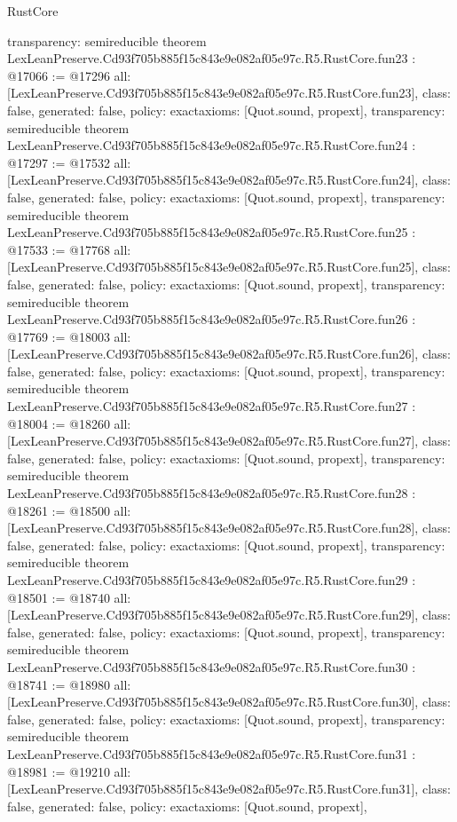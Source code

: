 \begin{lexlean}{RustCore}
\begin{coremodule}
{  transparency: semireducible
}
theorem LexLeanPreserve.Cd93f705b885f15c843e9e082af05e97c.R5.RustCore.fun23 : @17066 := @17296 {
  all: [LexLeanPreserve.Cd93f705b885f15c843e9e082af05e97c.R5.RustCore.fun23],
  class: false,
  generated: false,
  policy: exact{axioms: [Quot.sound, propext]},
  transparency: semireducible
}
theorem LexLeanPreserve.Cd93f705b885f15c843e9e082af05e97c.R5.RustCore.fun24 : @17297 := @17532 {
  all: [LexLeanPreserve.Cd93f705b885f15c843e9e082af05e97c.R5.RustCore.fun24],
  class: false,
  generated: false,
  policy: exact{axioms: [Quot.sound, propext]},
  transparency: semireducible
}
theorem LexLeanPreserve.Cd93f705b885f15c843e9e082af05e97c.R5.RustCore.fun25 : @17533 := @17768 {
  all: [LexLeanPreserve.Cd93f705b885f15c843e9e082af05e97c.R5.RustCore.fun25],
  class: false,
  generated: false,
  policy: exact{axioms: [Quot.sound, propext]},
  transparency: semireducible
}
theorem LexLeanPreserve.Cd93f705b885f15c843e9e082af05e97c.R5.RustCore.fun26 : @17769 := @18003 {
  all: [LexLeanPreserve.Cd93f705b885f15c843e9e082af05e97c.R5.RustCore.fun26],
  class: false,
  generated: false,
  policy: exact{axioms: [Quot.sound, propext]},
  transparency: semireducible
}
theorem LexLeanPreserve.Cd93f705b885f15c843e9e082af05e97c.R5.RustCore.fun27 : @18004 := @18260 {
  all: [LexLeanPreserve.Cd93f705b885f15c843e9e082af05e97c.R5.RustCore.fun27],
  class: false,
  generated: false,
  policy: exact{axioms: [Quot.sound, propext]},
  transparency: semireducible
}
theorem LexLeanPreserve.Cd93f705b885f15c843e9e082af05e97c.R5.RustCore.fun28 : @18261 := @18500 {
  all: [LexLeanPreserve.Cd93f705b885f15c843e9e082af05e97c.R5.RustCore.fun28],
  class: false,
  generated: false,
  policy: exact{axioms: [Quot.sound, propext]},
  transparency: semireducible
}
theorem LexLeanPreserve.Cd93f705b885f15c843e9e082af05e97c.R5.RustCore.fun29 : @18501 := @18740 {
  all: [LexLeanPreserve.Cd93f705b885f15c843e9e082af05e97c.R5.RustCore.fun29],
  class: false,
  generated: false,
  policy: exact{axioms: [Quot.sound, propext]},
  transparency: semireducible
}
theorem LexLeanPreserve.Cd93f705b885f15c843e9e082af05e97c.R5.RustCore.fun30 : @18741 := @18980 {
  all: [LexLeanPreserve.Cd93f705b885f15c843e9e082af05e97c.R5.RustCore.fun30],
  class: false,
  generated: false,
  policy: exact{axioms: [Quot.sound, propext]},
  transparency: semireducible
}
theorem LexLeanPreserve.Cd93f705b885f15c843e9e082af05e97c.R5.RustCore.fun31 : @18981 := @19210 {
  all: [LexLeanPreserve.Cd93f705b885f15c843e9e082af05e97c.R5.RustCore.fun31],
  class: false,
  generated: false,
  policy: exact{axioms: [Quot.sound, propext]},
}
\end{coremodule}
\end{lexlean}
